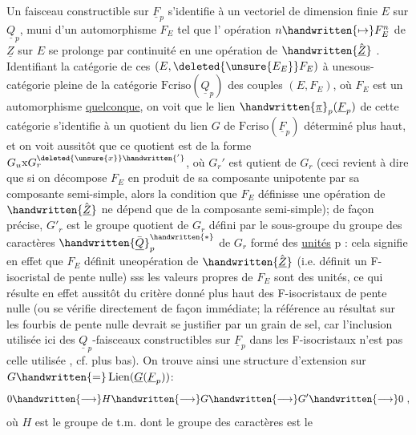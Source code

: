 Un faisceau constructible sur $\underline{F}_p$ s'identifie à un vectoriel de dimension finie $E$ sur $\underline{Q}_p$, muni d'un automorphisme $F_E$ tel que l' opération $n\handwritten{\mapsto}F_E^n$ de $\underline{Z}$ sur $E$ se prolonge par continuité en une opération de  $\handwritten{\hat{\underline{Z}}}$ . Identifiant  la catégorie de ces $(E,\deleted{\unsure{E_E}}F_E)$ à une\handwritten{\,}sous-catégorie pleine de la catégorie  $\mathrm{Fcriso}(\underline{Q}_p)$ des couples $(E,F_E)$, où $F_E$ est un automorphisme \uline{quelconque}, on voit que le lien  $\handwritten{\underline{\pi}}_p(\underline{F}_p)$ de cette catégorie s'identifie à un quotient du lien $G$ de $\mathrm{Fcriso}(\underline{F}_p)$ déterminé plus haut, et on voit aussitôt que ce quotient est de la forme $G_u\mathrm{x}G_r^{\deleted{\unsure{x}}\handwritten{'}}$, où $G_r'$ est  qutient de $G_r$ (ceci revient à dire que si on décompose $F_E$ en produit de sa composante unipotente par sa composante semi-simple, alors la condition que $F_E$ définisse une opération de $\handwritten{\hat{\underline{Z}}}$ ne dépend que de la composante semi-simple); de façon précise, $G'_r$ est le groupe quotient de $G_r$ défini par le sous-groupe du groupe des caractères $\handwritten{\bar{\underline{Q}}}_p^{\handwritten{*}}$ de $G_r$ formé des \uline{unités} p\uline{} : cela signifie en effet que $F_E$ définit uneopération de  $\handwritten{\hat{\underline{Z}}}$ (i.e. définit un F-isocristal de pente nulle) sss les valeurs propres de $F_E$ sont des unités, ce qui résulte en effet aussitôt du critère donné plus haut des F-isocristaux de pente nulle (ou se vérifie directement de façon immédiate; la référence au résultat sur les fourbis de pente nulle devrait se justifier par un grain de sel, car l'inclusion utilisée ici des $\underline{Q}_p$-faisceaux constructibles sur $\underline{F}_p$ dans les F-isocristaux n'est pas celle utilisée , cf. plus bas). On trouve ainsi une structure d'extension sur $G\handwritten{=}\operatorname{Lien}(\underline{G}(\underline{F}_p))$:
\[
0\handwritten{\longrightarrow}H\handwritten{\longrightarrow}G\handwritten{\longrightarrow}G'\handwritten{\longrightarrow}0\ ,
\]
où $H$ est le groupe de t.m. dont le groupe des caractères est le


